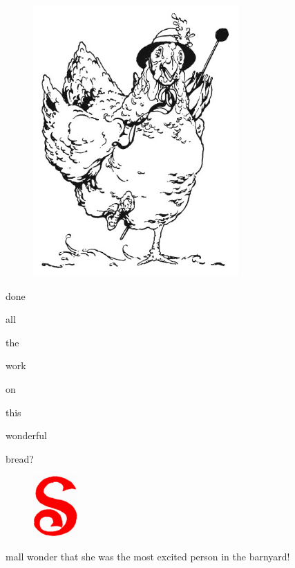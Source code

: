\documentclass[letterpaper, 10pt, openany]{memoir}
\begin{document}
\vspace{2\onelineskip}
\begin{figure}
	\includegraphics[width=0.7\textwidth]{image_004.jpg}
\end{figure}

done

\vspace{\onelineskip}

all

\vspace{\onelineskip}

the

\vspace{\onelineskip}

work

\vspace{\onelineskip}

on

\vspace{\onelineskip}

this

\vspace{\onelineskip}

wonderful

\vspace{\onelineskip}

bread?

\newpage
\begin{figure}
	\includegraphics[width=0.15\textwidth]{image_017_1.jpg}
\end{figure}
mall wonder that she was the most excited person in the barnyard!
\end{document}
